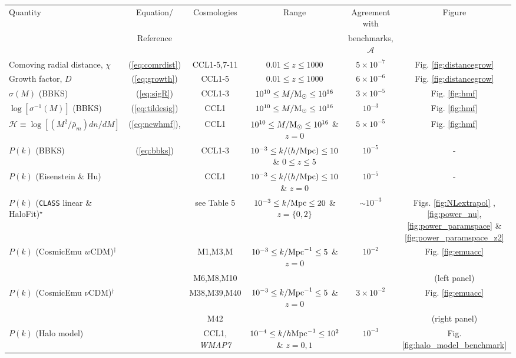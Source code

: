 
%
\begin{sidewaystable*}[!htp]
  \vskip 4cm
  \centering
  \begin{tabular}{ l|c c c c c}
    \hline
    Quantity & Equation/ & Cosmologies & Range & Agreement with & Figure \\
    & Reference &  & & benchmarks, $\mathcal{A}$ & \\
    \hline
    Comoving radial distance, $\chi$ & (\ref{eq:comrdist}) & CCL1-5,7-11 & $0.01 \leq z\leq 1000$ &  $5\times 10^{-7}$ & Fig. \ref{fig:distancegrow}\\
    Growth factor, $D$ & (\ref{eq:growth}) & CCL1-5 &  $0.01 \leq z\leq 1000 $ &  $6\times 10^{-6}$ & Fig. \ref{fig:distancegrow}\\
    $\sigma(M)$ (BBKS) & (\ref{eq:sigR}) & CCL1-3 &  $10^{10}\leq M/{\rm M}_\odot\leq 10^{16}$ &  $3\times 10^{-5}$ & Fig. \ref{fig:hmf}\\
    $\log[\sigma^{-1}(M)]$ (BBKS) & (\ref{eq:tildesig}) & CCL1 &  $10^{10}\leq M/{\rm M}_\odot\leq 10^{16}$ &  $10^{-3}$ & Fig. \ref{fig:hmf}\\
    $\mathcal H \equiv \log[(M^2/\bar{\rho}_m)dn/dM]$  & (\ref{eq:newhmf}), \citet{Tinker2010} & CCL1 & $10^{10}\leq M/{\rm M}_\odot\leq 10^{16}$ \& $z=0$ & $5\times 10^{-5}$ & Fig. \ref{fig:hmf}\\
    $P(k)$ (BBKS) & (\ref{eq:bbks}) & CCL1-3 & $10^{-3}\leq k/(h/{\rm Mpc})\leq 10$ \& $0\leq z\leq 5$ &  $10^{-5}$ & -\\
    $P(k)$ (Eisenstein \& Hu) & \citet{1998ApJ...496..605E}  & CCL1 & $10^{-3}\leq k/(h/{\rm Mpc})\leq 10$ \& $z=0$ & $10^{-5}$ & -\\
    $P(k)$ ({\tt CLASS} linear \& HaloFit)$^\star$ & \citet{CLASS_halofit}  & see Table 5 & $10^{-3}\leq k/{\rm Mpc}\leq 20$ \& $z=\{0,2\}$  &$\sim 10^{-3}$ & Figs. \ref{fig:NLextrapol} , \ref{fig:power_nu}, \ref{fig:power_paramspace} \& \ref{fig:power_paramspace_z2} \\
    $P(k)$ (CosmicEmu $w$CDM)$^\dag$ & \citet{Lawrence17} & M1,M3,M & $10^{-3}\leq k/{\rm Mpc}^{-1}\leq 5$ \& $z=0$  & $10^{-2}$ & Fig. \ref{fig:emuacc} \\
    & & M6,M8,M10 & & & (left panel)\\
    $P(k)$ (CosmicEmu $\nu$CDM)$^\dag$ & \citet{Lawrence17} & M38,M39,M40 & $10^{-3}\leq k/{\rm Mpc}^{-1}\leq 5$ \& $z=0$ & $3\times 10^{-2}$ & Fig. \ref{fig:emuacc} \\
    &  & M42 &  &  & (right panel)\\
    $P(k)$ (Halo model) & \citet{Cooray2002} & CCL1, {\it WMAP7} & $10^{-4}\leq k/h{\rm Mpc}^{-1}\leq 10^{2}$ \& $z=0,1$ & $10^{-3}$ & Fig. \ref{fig:halo_model_benchmark}\\

\end{tabular}
\end{sidewaystable*}
